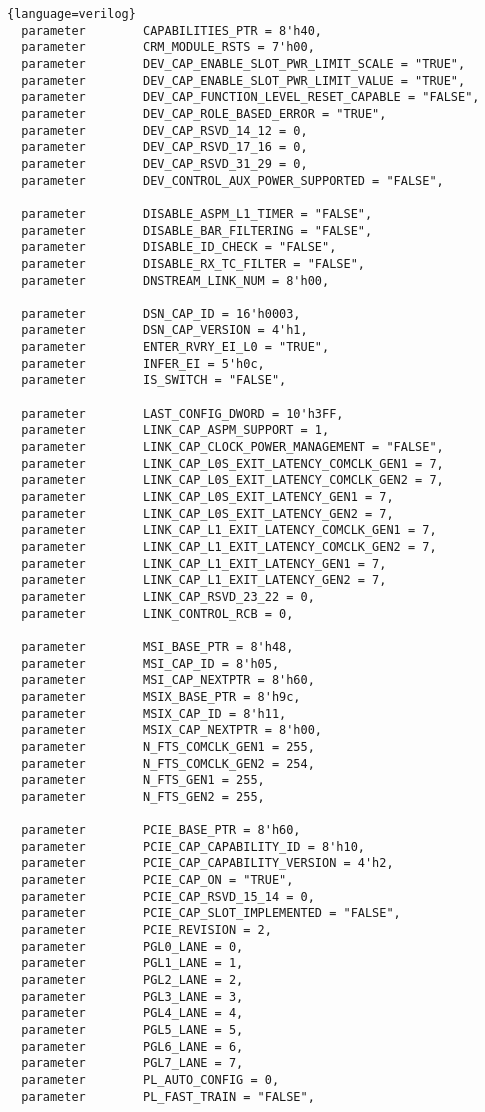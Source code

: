 \begin{lstlisting}{language=verilog}
  parameter        CAPABILITIES_PTR = 8'h40,
  parameter        CRM_MODULE_RSTS = 7'h00,
  parameter        DEV_CAP_ENABLE_SLOT_PWR_LIMIT_SCALE = "TRUE",
  parameter        DEV_CAP_ENABLE_SLOT_PWR_LIMIT_VALUE = "TRUE",
  parameter        DEV_CAP_FUNCTION_LEVEL_RESET_CAPABLE = "FALSE",
  parameter        DEV_CAP_ROLE_BASED_ERROR = "TRUE",
  parameter        DEV_CAP_RSVD_14_12 = 0,
  parameter        DEV_CAP_RSVD_17_16 = 0,
  parameter        DEV_CAP_RSVD_31_29 = 0,
  parameter        DEV_CONTROL_AUX_POWER_SUPPORTED = "FALSE",

  parameter        DISABLE_ASPM_L1_TIMER = "FALSE",
  parameter        DISABLE_BAR_FILTERING = "FALSE",
  parameter        DISABLE_ID_CHECK = "FALSE",
  parameter        DISABLE_RX_TC_FILTER = "FALSE",
  parameter        DNSTREAM_LINK_NUM = 8'h00,

  parameter        DSN_CAP_ID = 16'h0003,
  parameter        DSN_CAP_VERSION = 4'h1,
  parameter        ENTER_RVRY_EI_L0 = "TRUE",
  parameter        INFER_EI = 5'h0c,
  parameter        IS_SWITCH = "FALSE",

  parameter        LAST_CONFIG_DWORD = 10'h3FF,
  parameter        LINK_CAP_ASPM_SUPPORT = 1,
  parameter        LINK_CAP_CLOCK_POWER_MANAGEMENT = "FALSE",
  parameter        LINK_CAP_L0S_EXIT_LATENCY_COMCLK_GEN1 = 7,
  parameter        LINK_CAP_L0S_EXIT_LATENCY_COMCLK_GEN2 = 7,
  parameter        LINK_CAP_L0S_EXIT_LATENCY_GEN1 = 7,
  parameter        LINK_CAP_L0S_EXIT_LATENCY_GEN2 = 7,
  parameter        LINK_CAP_L1_EXIT_LATENCY_COMCLK_GEN1 = 7,
  parameter        LINK_CAP_L1_EXIT_LATENCY_COMCLK_GEN2 = 7,
  parameter        LINK_CAP_L1_EXIT_LATENCY_GEN1 = 7,
  parameter        LINK_CAP_L1_EXIT_LATENCY_GEN2 = 7,
  parameter        LINK_CAP_RSVD_23_22 = 0,
  parameter        LINK_CONTROL_RCB = 0,

  parameter        MSI_BASE_PTR = 8'h48,
  parameter        MSI_CAP_ID = 8'h05,
  parameter        MSI_CAP_NEXTPTR = 8'h60,
  parameter        MSIX_BASE_PTR = 8'h9c,
  parameter        MSIX_CAP_ID = 8'h11,
  parameter        MSIX_CAP_NEXTPTR = 8'h00,
  parameter        N_FTS_COMCLK_GEN1 = 255,
  parameter        N_FTS_COMCLK_GEN2 = 254,
  parameter        N_FTS_GEN1 = 255,
  parameter        N_FTS_GEN2 = 255,

  parameter        PCIE_BASE_PTR = 8'h60,
  parameter        PCIE_CAP_CAPABILITY_ID = 8'h10,
  parameter        PCIE_CAP_CAPABILITY_VERSION = 4'h2,
  parameter        PCIE_CAP_ON = "TRUE",
  parameter        PCIE_CAP_RSVD_15_14 = 0,
  parameter        PCIE_CAP_SLOT_IMPLEMENTED = "FALSE",
  parameter        PCIE_REVISION = 2,
  parameter        PGL0_LANE = 0,
  parameter        PGL1_LANE = 1,
  parameter        PGL2_LANE = 2,
  parameter        PGL3_LANE = 3,
  parameter        PGL4_LANE = 4,
  parameter        PGL5_LANE = 5,
  parameter        PGL6_LANE = 6,
  parameter        PGL7_LANE = 7,
  parameter        PL_AUTO_CONFIG = 0,
  parameter        PL_FAST_TRAIN = "FALSE",


\end{lstlisting}
